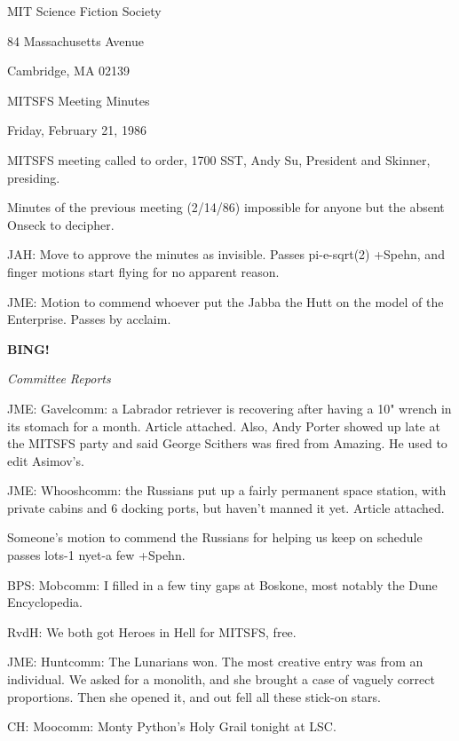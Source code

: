 \documentclass[12pt]{article}
\newcommand{\bing}{{\bf BING!} }
\newcommand{\goto}[1]{\bing \vskip 12pt \centerline{{\em{#1}}}}
\begin{document}
\begin{center}

MIT Science Fiction Society 

84 Massachusetts Avenue

Cambridge, MA 02139

\vspace{12pt}

MITSFS Meeting Minutes 

Friday, February 21, 1986

\end{center}
 
\vspace{18pt}

\setlength{\parskip}{6pt}

\noindent
MITSFS meeting called to order, 1700 SST,
Andy Su, President and Skinner, presiding.

Minutes of the previous meeting (2/14/86) impossible for anyone but the absent Onseck to decipher.

JAH: Move to approve the minutes as invisible. Passes pi-e-sqrt(2) +Spehn, and finger motions start flying for no apparent reason.

JME: Motion to commend whoever put the Jabba the Hutt on the model of the Enterprise. Passes by acclaim.

\goto{Committee Reports}

JME: Gavelcomm: a Labrador retriever is recovering after having a 10" wrench in its stomach for a month. Article attached. Also, Andy Porter showed up late at the MITSFS party and said George Scithers was fired from Amazing. He used to edit Asimov's.

JME: Whooshcomm: the Russians put up a fairly permanent space station, with private cabins and 6 docking ports, but haven't manned it yet. Article attached.

Someone's motion to commend the Russians for helping us keep on schedule passes lots-1 nyet-a few +Spehn.

BPS: Mobcomm: I filled in a few tiny gaps at Boskone, most notably the Dune Encyclopedia.

RvdH: We both got Heroes in Hell for MITSFS, free.

JME: Huntcomm: The Lunarians won. The most creative entry was from an individual. We asked for a monolith, and she brought a case of vaguely correct proportions. Then she opened it, and out fell all these stick-on stars.

CH: Moocomm: Monty Python's Holy Grail tonight at LSC.
\end{document}
